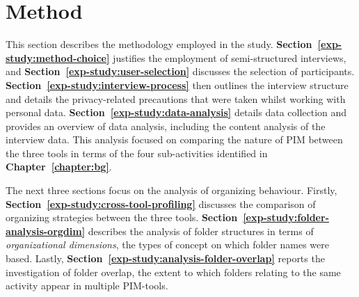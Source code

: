 \newpage
\section{Method}
\label{exp-study:method}

This section describes the methodology employed in the study.  \textbf{Section~\ref{exp-study:method-choice}} justifies the employment of semi-structured interviews, and \textbf{Section~\ref{exp-study:user-selection}} discusses the selection of participants.
\textbf{Section~\ref{exp-study:interview-process}} then outlines the interview structure and details the privacy-related precautions that were taken whilst working with personal data.  
\textbf{Section~\ref{exp-study:data-analysis}} details data collection and provides an overview of data analysis, including the content analysis of the interview data.  This analysis focused on comparing the nature of PIM between the three tools in terms of the four sub-activities identified in \textbf{Chapter~\ref{chapter:bg}}.

The next three sections focus on the analysis of organizing behaviour.
Firstly, \textbf{Section~\ref{exp-study:cross-tool-profiling}} discusses the comparison of organizing strategies between the three tools.
\textbf{Section~\ref{exp-study:folder-analysis-orgdim}} describes the analysis of folder structures in terms of \textit{organizational dimensions}, the types of concept on which folder names were based. %
Lastly, \textbf{Section~\ref{exp-study:analysis-folder-overlap}} reports the investigation of folder overlap, the extent to which folders relating to the same activity appear in multiple PIM-tools. %

